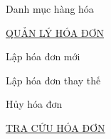 Danh mục hàng hóa



















\underline{\textsc{QUẢN LÝ HÓA ĐƠN }}





























Lập hóa đơn mới



















Lập hóa đơn thay thế



















Hủy hóa đơn



















\underline{\textsc{TRA CỨU HÓA ĐƠN}}





























